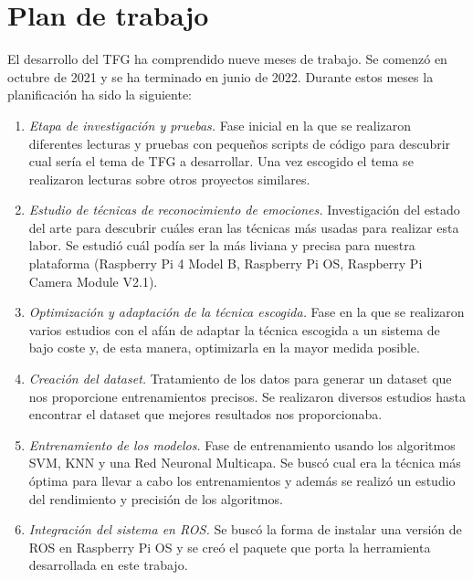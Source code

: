 \section{Plan de trabajo}
\label{sec:plantrabajo}

El desarrollo del TFG ha comprendido nueve meses de trabajo. Se comenzó en octubre de 2021 y se ha terminado en junio de 2022. Durante estos meses la planificación ha sido la siguiente:

\begin{enumerate}
    \item \textit{Etapa de investigación y pruebas.} Fase inicial en la que se realizaron diferentes lecturas y pruebas con pequeños scripts de código para descubrir cual sería el tema de TFG a desarrollar. Una vez escogido el tema se realizaron lecturas sobre otros proyectos similares.
    
    \item \textit{Estudio de técnicas de reconocimiento de emociones.} Investigación del estado del arte para descubrir cuáles eran las técnicas más usadas para realizar esta labor. Se estudió cuál podía ser la más liviana y precisa para nuestra plataforma (Raspberry Pi 4 Model B, Raspberry Pi OS, Raspberry Pi Camera Module V2.1).
    
    \item \textit{Optimización y adaptación de la técnica escogida.} Fase en la que se realizaron varios estudios con el afán de adaptar la técnica escogida a un sistema de bajo coste y, de esta manera, optimizarla en la mayor medida posible.
    
    \item \textit{Creación del dataset.} Tratamiento de los datos para generar un dataset que nos proporcione entrenamientos precisos. Se realizaron diversos estudios hasta encontrar el dataset que mejores resultados nos proporcionaba.
    
    \item \textit{Entrenamiento de los modelos.} Fase de entrenamiento usando los algoritmos SVM, KNN y una Red Neuronal Multicapa. Se buscó cual era la técnica más óptima para llevar a cabo los entrenamientos y además se realizó un estudio del rendimiento y precisión de los algoritmos.
    
    \item \textit{Integración del sistema en ROS.} Se buscó la forma de instalar una versión de ROS en Raspberry Pi OS y se creó el paquete que porta la herramienta desarrollada en este trabajo.
\end{enumerate}
